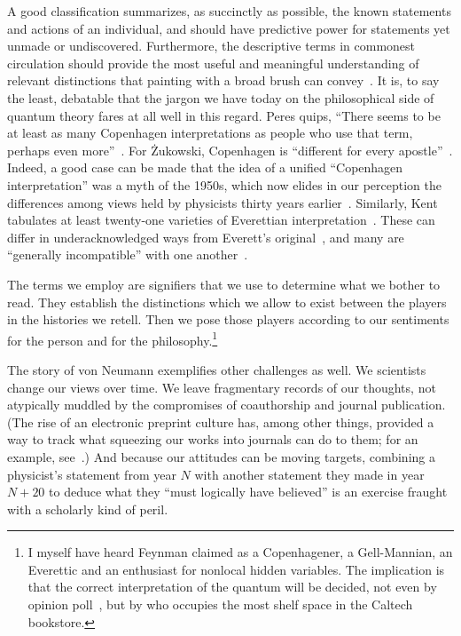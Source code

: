 \documentclass[aps,pra,superscriptaddress,12pt,tightenlines,nofootinbib]{revtex4}
\begin{document}
A good classification summarizes, as succinctly as possible, the known
statements and actions of an individual, and should have predictive
power for statements yet unmade or undiscovered.  Furthermore, the
descriptive terms in commonest circulation should provide the most
useful and meaningful understanding of relevant distinctions that
painting with a broad brush can convey~\cite{Brown2010}.  It is, to
say the least, debatable that the jargon we have today on the
philosophical side of quantum theory fares at all well in this regard.
Peres quips, ``There seems to be at least as many Copenhagen
interpretations as people who use that term, perhaps even
more''~\cite{Peres2002}.  For \.{Z}ukowski, Copenhagen is ``different
for every apostle''~\cite{Zukowski2015}.  Indeed, a
good case can be made that the idea of a unified ``Copenhagen
interpretation'' was a myth of the 1950s, which now elides in our
perception the differences among views held by physicists thirty years
earlier~\cite{Howard2004, Camilleri2009, Camilleri2015}.  Similarly,
Kent tabulates at least twenty-one varieties of Everettian
interpretation~\cite{Kent2010}.  These can differ in underacknowledged
ways from Everett's original~\cite{Kent2011}, and many are ``generally
incompatible'' with one another~\cite{Kent2014}.

The terms we employ are signifiers that we use to determine what we
bother to read.  They establish the distinctions which we allow to
exist between the players in the histories we retell.  Then we pose
those players according to our sentiments for the person and for the
philosophy.\footnote{I myself have heard Feynman claimed as a
  Copenhagener, a Gell-Mannian, an Everettic and an enthusiast for
  nonlocal hidden variables.  The implication is that the correct
  interpretation of the quantum will be decided, not even by opinion
  poll~\cite{Nielsen2004, Fuchs2014b}, but by who occupies the most
  shelf space in the Caltech bookstore.}

The story of von Neumann exemplifies other challenges as well.  We
scientists change our views over time.  We leave fragmentary records
of our thoughts, not atypically muddled by the compromises of
coauthorship and journal publication.  (The rise of an electronic
preprint culture has, among other things, provided a way to track what
squeezing our works into journals can do to them; for an example,
see~\cite{Ferrie2014}.)  And because our attitudes can be moving
targets, combining a physicist's statement from year $N$ with another
statement they made in year $N + 20$ to deduce what they ``must
logically have believed'' is an exercise fraught with a scholarly kind
of peril.
\end{document}

